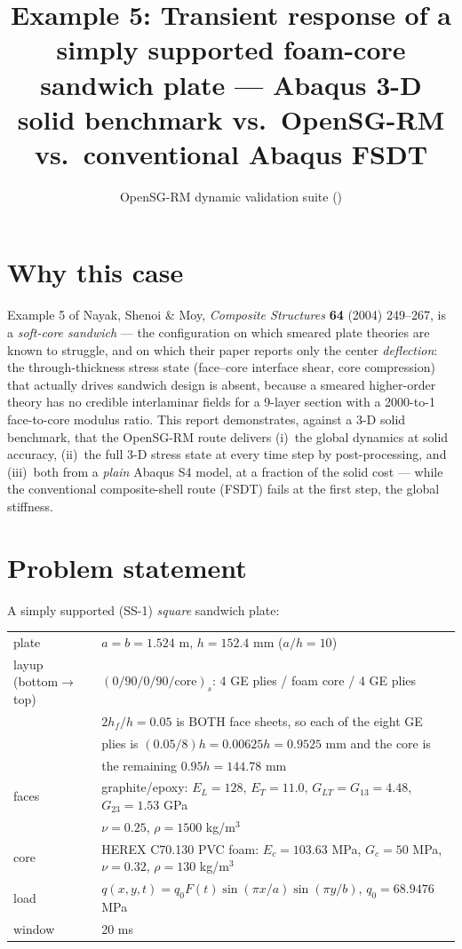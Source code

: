 \documentclass[11pt]{article}
\title{Example 5: Transient response of a simply supported foam-core
sandwich plate --- Abaqus 3-D solid benchmark vs.\ OpenSG-RM vs.\
conventional Abaqus FSDT}
\author{OpenSG-RM dynamic validation suite (\code{examples/opensg-rm\_dynamic/ex5})}
\date{}
\begin{document}
\maketitle

\section{Why this case}
Example 5 of Nayak, Shenoi \& Moy, \emph{Composite Structures} \textbf{64}
(2004) 249--267, is a \emph{soft-core sandwich} --- the configuration on
which smeared plate theories are known to struggle, and on which their
paper reports only the center \emph{deflection}: the through-thickness
stress state (face--core interface shear, core compression) that actually
drives sandwich design is absent, because a smeared higher-order theory
has no credible interlaminar fields for a 9-layer section with a
2000-to-1 face-to-core modulus ratio.  This report demonstrates, against a
3-D solid benchmark, that the OpenSG-RM route delivers (i)~the global
dynamics at solid accuracy, (ii)~the full 3-D stress state at every time
step by post-processing, and (iii)~both from a \emph{plain} Abaqus S4
model, at a fraction of the solid cost --- while the conventional
composite-shell route (FSDT) fails at the first step, the global
stiffness.

\section{Problem statement}
A simply supported (SS-1) \emph{square} sandwich plate:

\begin{center}\begin{tabular}{ll}\toprule
plate & $a=b=1.524$ m, $h=152.4$ mm ($a/h=10$)\\
layup (bottom$\to$top) & $(0/90/0/90/\mathrm{core})_s$: 4 GE plies /
foam core / 4 GE plies\\
 & $2h_f/h=0.05$ is BOTH face sheets, so each of the eight GE\\
 & plies is $(0.05/8)h=0.00625h=0.9525$ mm and the core is\\
 & the remaining $0.95h=144.78$ mm\\
faces & graphite/epoxy: $E_L=128$, $E_T=11.0$, $G_{LT}=G_{13}=4.48$,
$G_{23}=1.53$ GPa\\
 & $\nu=0.25$, $\rho=1500$ kg/m$^3$\\
core & HEREX C70.130 PVC foam: $E_c=103.63$ MPa, $G_c=50$ MPa,
$\nu=0.32$, $\rho=130$ kg/m$^3$\\
load & $q(x,y,t)=q_0F(t)\sin(\pi x/a)\sin(\pi y/b)$, $q_0=68.9476$ MPa\\
window & 20 ms\\ \bottomrule\end{tabular}\end{center}
\end{document}
